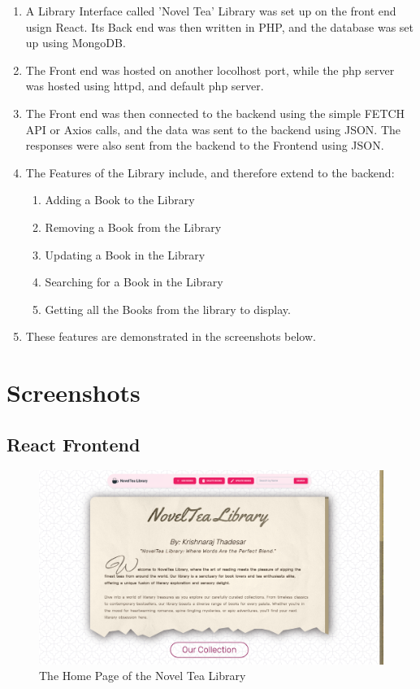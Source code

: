 \documentclass[11pt]{article}
\begin{document}
\begin{enumerate}
    \item A Library Interface called 'Novel Tea' Library was set up on the front end usign React. Its Back end was then written in PHP, and the database was set up using MongoDB.
    \item The Front end was hosted on another locolhost port, while the php server was hosted using httpd, and default php server.
    \item The Front end was then connected to the backend using the simple FETCH API or Axios calls, and the data was sent to the backend using JSON. The responses were also sent from the backend to the Frontend using JSON.
    \item The Features of the Library include, and therefore extend to the backend:
          \begin{enumerate}
              \item Adding a Book to the Library
              \item Removing a Book from the Library
              \item Updating a Book in the Library
              \item Searching for a Book in the Library
              \item Getting all the Books from the library to display.
          \end{enumerate}
    \item These features are demonstrated in the screenshots below.
\end{enumerate}

\section{Screenshots}

\subsection{React Frontend}
\begin{figure}[H]
    \centering
    \includegraphics[width=.95\textwidth]{Screenshots/home.png}
    \caption{The Home Page of the Novel Tea Library}
\end{figure}
\end{document}
